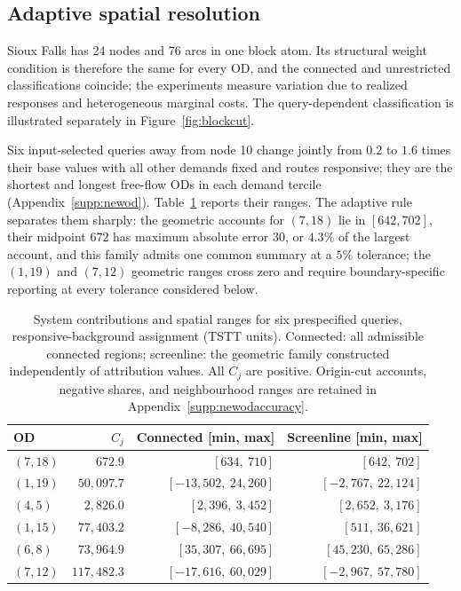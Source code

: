 \subsection{Adaptive spatial resolution}\label{sec:adequate}
Sioux Falls has 24 nodes and 76 arcs in one block atom. Its structural weight condition is therefore the same for every OD, and the connected and unrestricted classifications coincide; the experiments measure variation due to realized responses and heterogeneous marginal costs. The query-dependent classification is illustrated separately in Figure~\ref{fig:blockcut}.

Six input-selected queries away from node 10 change jointly from $0.2$ to $1.6$ times their base values with all other demands fixed and routes responsive; they are the shortest and longest free-flow ODs in each demand tercile (Appendix~\ref{supp:newod}). Table~\ref{tab:newod} reports their ranges. The adaptive rule separates them sharply: the geometric accounts for $(7,18)$ lie in $[642,702]$, their midpoint $672$ has maximum absolute error $30$, or $4.3\%$ of the largest account, and this family admits one common summary at a $5\%$ tolerance; the $(1,19)$ and $(7,12)$ geometric ranges cross zero and require boundary-specific reporting at every tolerance considered below.
\begin{table}[pos=htbp]
\footnotesize
\caption{System contributions and spatial ranges for six prespecified queries,
responsive-background assignment (TSTT units). Connected: all admissible connected regions;
screenline: the geometric family constructed independently of attribution
values. All $C_j$ are positive. Origin-cut accounts, negative shares, and
neighbourhood ranges are retained in Appendix~\ref{supp:newodaccuracy}.}
\label{tab:newod}
\small
\begin{tabular*}{\tblwidth}{@{\extracolsep{\fill}}lrrr}
\toprule
OD & $C_j$ & Connected [min, max] & Screenline [min, max]\\
\midrule
$(7,18)$ & $672.9$ & $[634{,}\ 710]$ & $[642{,}\ 702]$ \\
$(1,19)$ & $50{,}097.7$ & $[-13{,}502{,}\ 24{,}260]$ & $[-2{,}767{,}\ 22{,}124]$ \\
$(4,5)$ & $2{,}826.0$ & $[2{,}396{,}\ 3{,}452]$ & $[2{,}652{,}\ 3{,}176]$ \\
$(1,15)$ & $77{,}403.2$ & $[-8{,}286{,}\ 40{,}540]$ & $[511{,}\ 36{,}621]$ \\
$(6,8)$ & $73{,}964.9$ & $[35{,}307{,}\ 66{,}695]$ & $[45{,}230{,}\ 65{,}286]$ \\
$(7,12)$ & $117{,}482.3$ & $[-17{,}616{,}\ 60{,}029]$ & $[-2{,}967{,}\ 57{,}780]$ \\
\bottomrule
\end{tabular*}
\end{table}

